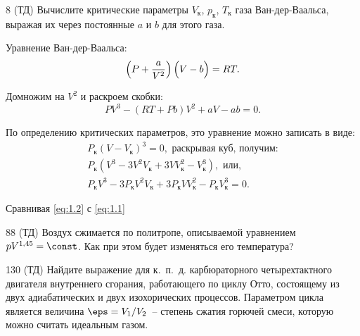 \documentclass[pscyr]{hedwork}
\begin{document}
  \maketitle

  \begin{task}{8 (ТД)}{
    Вычислите критические параметры \( V_\text{к} \), \( p_\text{к} \),
    \( T_\text{к} \) газа Ван-дер-Ваальса, выражая их через постоянные
    \( a \) и \( b \) для этого газа.
  }
  
  Уравнение Ван-дер-Ваальса:
  \[
    \left(P + \frac{a}{V^2}\right)\Bigl(V - b\Big) = RT.
  \]
  
  Домножим на \( V^2 \) и раскроем скобки:
  \begin{equation}
    PV^3 - (RT + Pb)V^2 + aV - ab = 0.
    \label{eq:1.1}
  \end{equation}

  По определению критических параметров, это уравнение можно записать в виде:
  \begin{gather}
    P_\text{к} (V - V_\text{к})^3 = 0, \text{ раскрывая куб, получим:}
      \nonumber \\
    P_\text{к} (V^3 - 3V^2 V_\text{к} + 3V V_\text{к}^2 - V_\text{к}^3),
      \text{ или,}\nonumber \\
    P_\text{к} V^3 - 3P_\text{к} V^2 V_\text{к} + 3P_\text{к} V V_\text{к}^2 -
      P_\text{к} V_\text{к}^3 = 0. \label{eq:1.2}
  \end{gather}

  Сравнивая \eqref{eq:1.2} с \eqref{eq:1.1}

  \end{task}

  \begin{task}{88 (ТД)}{
    Воздух сжимается по политропе, описываемой уравнением
    \( pV^{1,45} = \const \). Как при этом будет изменяться его температура?
  }
    
  \end{task}
  
  \begin{task}{130 (ТД)}{
    Найдите выражение для к.~п.~д. карбюраторного четырехтактного двигателя
    внутреннего сгорания, работающего по циклу Отто, состоящему из двух
    адиабатических и двух изохорических процессов. Параметром цикла является
    величина \( \eps = V_1 / V_2 \)~-- степень сжатия горючей смеси, которую
    можно считать идеальным газом.
  }
  
  \end{task}
  
\end{document}

